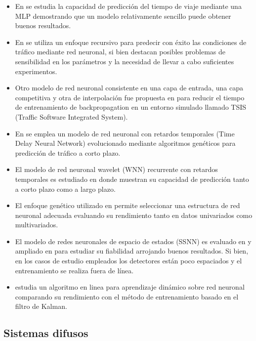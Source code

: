 \documentclass{llncs}
\begin{document}
\begin{itemize}
\item En \cite{Innamaa2005649} se estudia la capacidad de predicción del tiempo de viaje mediante una MLP demostrando que un modelo relativamente sencillo puede obtener buenos resultados.
\item En \cite{Zhang2000472} se utiliza un enfoque recursivo para predecir con éxito las condiciones de tráfico mediante red neuronal, si bien destacan posibles problemas de sensibilidad en los parámetros y la necesidad de llevar a cabo suficientes experimentos.
\item Otro modelo de red neuronal consistente en una capa de entrada, una capa competitiva y otra de interpolación fue  propuesta en \cite{Dharia2003607} para reducir el tiempo de entrenamiento de backpropagation en un entorno simulado llamado TSIS (Traffic Software Integrated System). 
\item En \cite{abdulhai2002short} se emplea un modelo de red neuronal con retardos temporales (Time Delay Neural Network) evolucionado mediante algoritmos genéticos para predicción de tráfico a corto plazo. 
\item El modelo de red neuronal wavelet (WNN) recurrente con retardos temporales es estudiado en \cite{jiang2005dynamic} donde muestran su capacidad de predicción tanto a corto plazo como a largo plazo.
\item El enfoque genético utilizado en \cite{vlahogianni2005optimized} permite seleccionar una estructura de red neuronal adecuada evaluando su rendimiento tanto en datos univariados como multivariados.
\item El modelo de redes neuronales de espacio de estados (SSNN) es evaluado en \cite{van2005accurate} y ampliado en \cite{van2006reliable} para estudiar su fiabilidad arrojando buenos resultados. Si bien, en los casos de estudio empleados los detectores están poco espaciados y el entrenamiento se realiza fuera de línea.
\item \cite{chen2001use} estudia un algoritmo en linea para aprendizaje dinámico sobre red neuronal comparando su rendimiento con el método de entrenamiento basado en el filtro de Kalman.

\end{itemize}


\subsection{Sistemas difusos}
\end{document}
